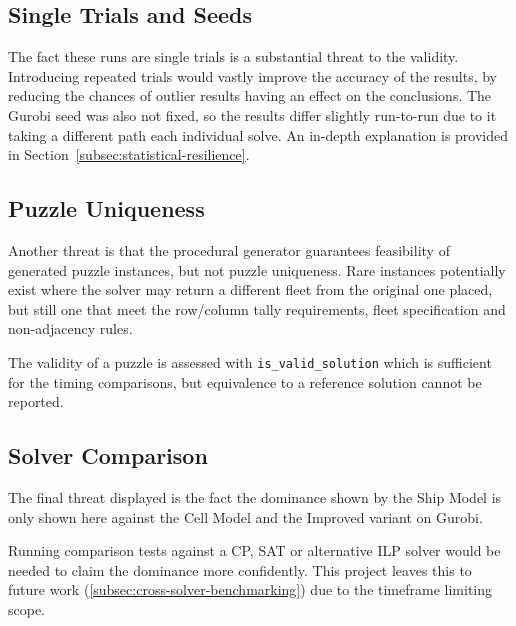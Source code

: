 \subsection{Single Trials and Seeds}\label{subsec:single-trials}
The fact these runs are single trials is a substantial threat to the validity. Introducing repeated trials would vastly improve the accuracy of the results, by reducing the chances of outlier results having an effect on the conclusions. The Gurobi seed was also not fixed, so the results differ slightly run-to-run due to it taking a different path each individual solve. An in-depth explanation is provided in Section~\ref{subsec:statistical-resilience}.

\subsection{Puzzle Uniqueness}\label{subsec:puzzle-uniqueness}
Another threat is that the procedural generator guarantees feasibility of generated puzzle instances, but not puzzle uniqueness. Rare instances potentially exist where the solver may return a different fleet from the original one placed, but still one that meet the row/column tally requirements, fleet specification and non-adjacency rules.

The validity of a puzzle is assessed with \verb|is_valid_solution| which is sufficient for the timing comparisons, but equivalence to a reference solution cannot be reported.

\subsection{Solver Comparison}\label{subsec:solver-comparison}
The final threat displayed is the fact the dominance shown by the Ship Model is only shown here against the Cell Model and the Improved variant on Gurobi. 

Running comparison tests against a CP, SAT or alternative ILP solver would be needed to claim the dominance more confidently. This project leaves this to future work (\ref{subsec:cross-solver-benchmarking}) due to the timeframe limiting scope.